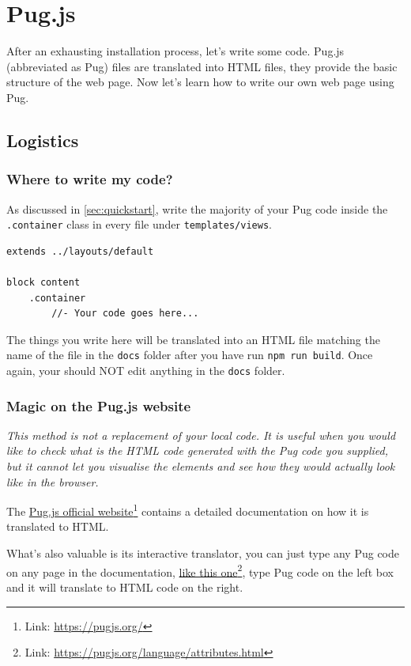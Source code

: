 \chapter{Pug.js}
\label{sec:pug1}

After an exhausting installation process, let's write some code.
Pug.js (abbreviated as Pug) files are translated into HTML files, they provide the basic structure of the web page. Now let's learn how to write our own web page using Pug.

\section{Logistics}

\subsection*{Where to write my code?}

As discussed in \cref{sec:quickstart}, write the majority of your Pug code inside the \texttt{.container} class in every file under \texttt{templates/views}. 

\begin{lstlisting}[language=pug]
extends ../layouts/default

block content
	.container
		//- Your code goes here...
\end{lstlisting}

The things you write here will be translated into an HTML file matching the name of the file in the \texttt{docs} folder after you have run \texttt{npm run build}. Once again, your should NOT edit anything in the \texttt{docs} folder.

\subsection*{Magic on the Pug.js website}

\textit{This method is not a replacement of your local code. It is useful when you would like to check what is the HTML code generated with the Pug code you supplied, but it cannot let you visualise the elements and see how they would actually look like in the browser.}
\vspace{6mm}

The \href{{https://pugjs.org/}}{Pug.js official website}\footnote{Link: \url{https://pugjs.org/}} contains a detailed documentation on how it is translated to HTML.

What's also valuable is its interactive translator, you can just type any Pug code on any page in the documentation, \href{https://pugjs.org/language/attributes.html}{like this one}\footnote{Link: \url{https://pugjs.org/language/attributes.html}}, type Pug code on the left box and it will translate to HTML code on the right.

